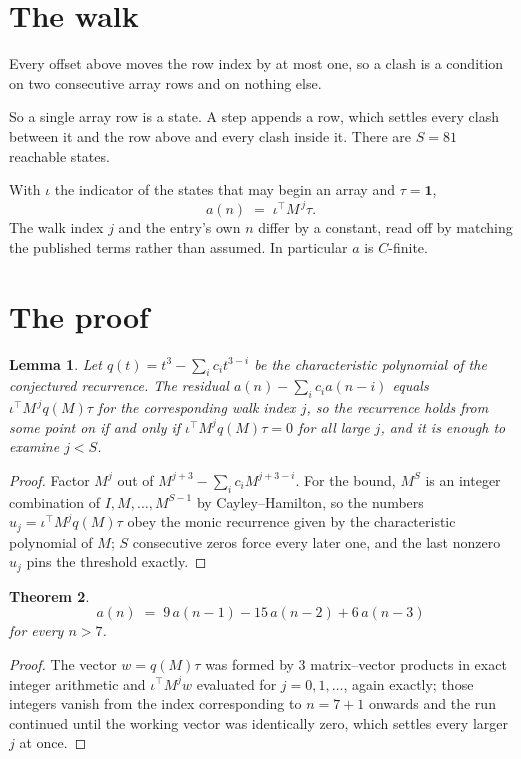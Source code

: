 \documentclass[11pt,a4paper]{article}
\theoremstyle{plain}
\newtheorem{theorem}{Theorem}
\newtheorem{lemma}[theorem]{Lemma}
\theoremstyle{definition}
\begin{document}
\section{The walk}

Every offset above moves the row index by at most one, so a clash is a condition on two
consecutive array rows and on nothing else.

So a single array row is a state. A step appends a row, which settles every clash between it
and the row above and every clash inside it. There are $S=81$ reachable states.

With $\iota$ the indicator of the states that may begin an array and $\tau=\mathbf{1}$,
\[
a(n)\;=\;\iota^{\!\top}M^{\,j}\tau .
\]
The walk index $j$ and the entry's own $n$ differ by a constant, read off by matching the
published terms rather than assumed. In particular $a$ is $C$-finite.

\section{The proof}

\begin{lemma}\label{lem:crit}
Let $q(t)=t^{3}-\sum_i c_it^{3-i}$ be the characteristic polynomial of the
conjectured recurrence. The residual $a(n)-\sum_ic_ia(n-i)$ equals
$\iota^{\!\top}M^{\,j}q(M)\tau$ for the corresponding walk index $j$, so the recurrence
holds from some point on if and only if $\iota^{\!\top}M^{j}q(M)\tau=0$ for all large $j$,
and it is enough to examine $j<S$.
\end{lemma}

\begin{proof}
Factor $M^{j}$ out of $M^{j+3}-\sum_ic_iM^{j+3-i}$. For the bound, $M^{S}$
is an integer combination of $I,M,\dots,M^{S-1}$ by Cayley--Hamilton, so the numbers
$u_j=\iota^{\!\top}M^{j}q(M)\tau$ obey the monic recurrence given by the characteristic
polynomial of $M$; $S$ consecutive zeros force every later one, and the last nonzero $u_j$
pins the threshold exactly.
\end{proof}

\begin{theorem}
\[
a(n)\;=\;9\,a(n-1) - 15\,a(n-2) + 6\,a(n-3)
\]
for every $n>7$.
\end{theorem}

\begin{proof}
The vector $w=q(M)\tau$ was formed by $3$ matrix--vector products in exact integer
arithmetic and $\iota^{\!\top}M^{j}w$ evaluated for $j=0,1,\dots$, again exactly; those
integers vanish from the index corresponding to $n=7+1$ onwards and the run continued
until the working vector was identically zero, which settles every larger $j$ at once.
\end{proof}
\end{document}
